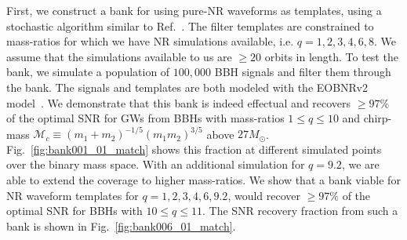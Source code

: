 \documentclass[aps,
prd,
twocolumn,
superscriptaddress,
lengthcheck,showpacs,letterpaper,nofootinbib,
floatfix]{revtex4-1}
\begin{document}
First, we construct a bank for using pure-NR waveforms as templates, 
using a stochastic algorithm similar to Ref.~\cite{Harry:2009ea,
Ajith:2012mn,Manca:2009xw}. The filter templates are constrained to 
mass-ratios for which we have NR simulations available, i.e. 
$q=1,2,3,4,6,8$. 
We assume that the simulations available to us are $\geq 20$ orbits in
length. To test the bank, we simulate a population of $100,000$ BBH 
signals and filter them through the bank. The signals and templates 
are both modeled with the EOBNRv2 model~\cite{BuonannoEOBv2Main}. We 
demonstrate that this bank is indeed effectual and recovers 
$\geq 97\%$ of the optimal SNR for GWs from BBHs with mass-ratios 
$1\leq q\leq 10$ and chirp-mass 
$\mathcal{M}_c\equiv (m_1+m_2)^{-1/5}(m_1 m_2)^{3/5}$ above $27M_\odot$. 
Fig.~\ref{fig:bank001_01_match} shows this fraction at different 
simulated points over the binary mass space. With an additional 
simulation for $q=9.2$, we are able to extend the coverage to higher
mass-ratios. We show that a bank viable for NR waveform templates for
$q=1,2,3,4,6,9.2$, would recover $\geq 97\%$ of the optimal SNR
for BBHs with $10\leq q\leq 11$. The SNR recovery fraction from
such a bank is shown in Fig.~\ref{fig:bank006_01_match}.
\end{document}
